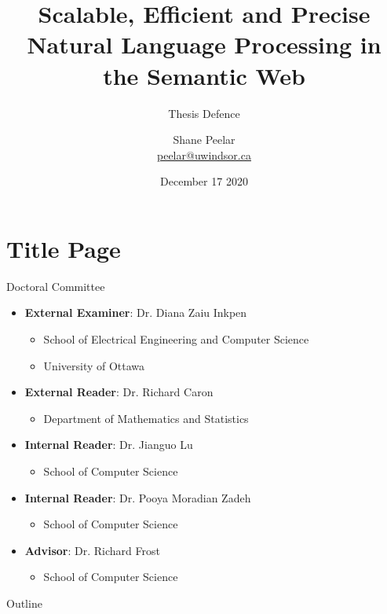 \documentclass[logoontitle,tabu,supertabular,aspectratio=43]{preney-uwindsor-beamer}
\title{Scalable, Efficient and Precise Natural Language Processing in the Semantic Web}
\subtitle{Thesis Defence}
\date[December 17 2020]{December 17 2020}
\author[]{\small Shane Peelar \texorpdfstring{\\}{} {\scriptsize\href{mailto:\emailshane}{peelar@uwindsor.ca}}}
\institute[University of Windsor]{
    School of Computer Science \texorpdfstring{\\}{}
    University of Windsor \texorpdfstring{\\}{}
    Windsor, Ontario, Canada \texorpdfstring{\\}{}
}
\begin{document}
	\tabulinesep=1pt

	\section*{Title Page}
	\begin{frame}
	\titlepage
	\end{frame}

  \begin{frame}{Doctoral Committee}
    \begin{itemize}
        \item[] \textbf{External Examiner}: Dr. Diana Zaiu Inkpen %
        \begin{itemize}
            \item[] School of Electrical Engineering and Computer Science
            \item[] University of Ottawa
        \end{itemize}
        \item[] \textbf{External Reader}: Dr. Richard Caron
        \begin{itemize}
            \item[] Department of Mathematics and Statistics
        \end{itemize}
        \item[] \textbf{Internal Reader}: Dr. Jianguo Lu
        \begin{itemize}
            \item[] School of Computer Science
        \end{itemize}
        \item[] \textbf{Internal Reader}: Dr. Pooya Moradian Zadeh
        \begin{itemize}
            \item[] School of Computer Science
        \end{itemize}
        \item[] \textbf{Advisor}: Dr. Richard Frost
        \begin{itemize}
            \item[] School of Computer Science
        \end{itemize}
    \end{itemize}
    \end{frame}

    \begin{frame}[allowframebreaks]{Outline}
       \tableofcontents[hideallsubsections]
    \end{frame}
\end{document}
